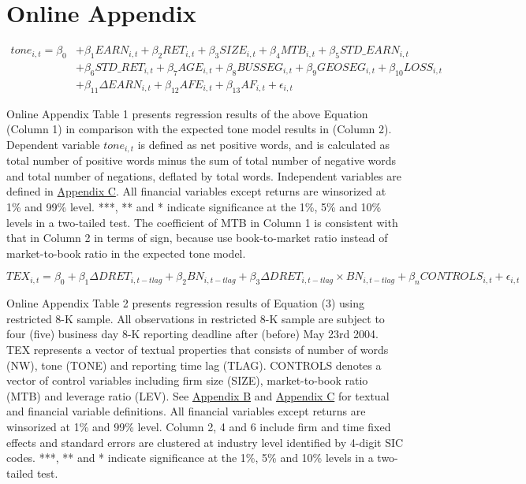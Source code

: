 \section*{Online Appendix}


\begin{equation*}
\begin{split}
tone_{i,t}=\beta_0&+\beta_1EARN_{i,t}+\beta_2RET_{i,t}+\beta_3SIZE_{i,t}+\beta_4MTB_{i,t}+\beta_5STD\_EARN_{i,t}\\
&+\beta_6STD\_RET_{i,t}+\beta_7AGE_{i,t}+\beta_8BUSSEG_{i,t}+\beta_9GEOSEG_{i,t}+\beta_{10}LOSS_{i,t}\\
&+\beta_{11}\Delta EARN_{i,t}+\beta_{12}AFE_{i,t}+\beta_{13}AF_{i,t}+\epsilon_{i,t}
\end{split}
\end{equation*}

Online Appendix Table 1 presents regression results of the above Equation (Column 1) in comparison with the expected tone model results in \citet*{huangToneManagement2014} (Column 2). Dependent variable $tone_{i,t}$ is defined as net positive words, and is calculated as total number of positive words minus the sum of total number of negative words and total number of negations, deflated by total words. Independent variables are defined in \hyperref[appc]{Appendix C}. All financial variables except returns are winsorized at 1\% and 99\% level. ***, ** and * indicate significance at the 1\%, 5\% and 10\% levels in a two-tailed test. The coefficient of MTB in Column 1 is consistent with that in Column 2 in terms of sign, because \citet*{huangToneManagement2014} use book-to-market ratio instead of market-to-book ratio in the expected tone model. 


\newpage

\setcounter{equation}{2}
\begin{equation}
TEX_{i,t}=\beta_0+\beta_1\Delta DRET_{i,t-tlag}+\beta_2BN_{i,t-tlag}+\beta_3\Delta DRET_{i,t-tlag}\times BN_{i,t-tlag}+\beta_nCONTROLS_{i,t}+\epsilon_{i,t}
\end{equation}

Online Appendix Table 2 presents regression results of Equation (3) using restricted 8-K sample. All observations in restricted 8-K sample are subject to four (five) business day 8-K reporting deadline after (before) May 23rd 2004. TEX represents a vector of textual properties that consists of number of words (NW), tone (TONE) and reporting time lag (TLAG). CONTROLS denotes a vector of control variables including firm size (SIZE), market-to-book ratio (MTB) and leverage ratio (LEV). See \hyperref[appb]{Appendix B} and \hyperref[appc]{Appendix C} for textual and financial variable definitions. All financial variables except returns are winsorized at 1\% and 99\% level. Column 2, 4 and 6 include firm and time fixed effects and standard errors are clustered at industry level identified by 4-digit SIC codes. ***, ** and * indicate significance at the 1\%, 5\% and 10\% levels in a two-tailed test.
